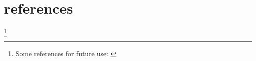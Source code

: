 \documentclass[10pt,titlepage]{book}
\begin{document}
\appendix

\section{references}

\footnote{Some references for future use:
\cite{arthan1991formal}
\cite{beeson2012foundations}
\cite{centrone2019reflections}
\cite{dzamonja2019}
\cite{gettier1963justified}
\cite{jones1992a,jones1992b}
\cite{kline1990mathematical1}
\cite{kline1990mathematical2}
\cite{kline1990mathematical3}
\cite{kumar2016self}
\cite{kuhn2000structure}
\cite{kuhn2012structure}
\cite{oliveira2006unifying}
\cite{shapiro1991foundations}
\cite{shapiroHPML}
\cite{tarski31}
\cite{tarski56}
}

{}


\end{document}
